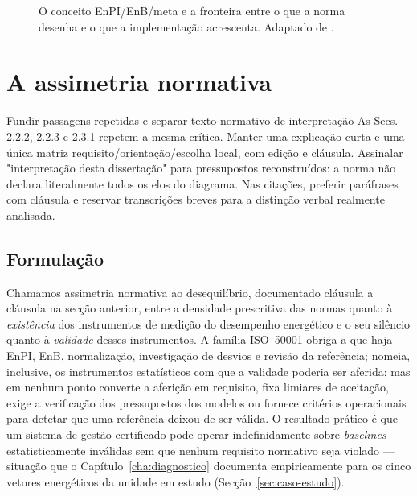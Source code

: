 \begin{figure}[htbp]
  \centering
  \caption[O conceito EnPI/EnB/meta e a extensão de implementação]{O conceito EnPI/EnB/meta e a fronteira entre o que a norma desenha e o que a implementação acrescenta. Adaptado de \cite[Figura~1]{ISO50006_2014}.}
  \label{fig:enpi-enb-meta}
\end{figure}

\section{A assimetria normativa}
\label{sec:assimetria}
{Fundir passagens repetidas e separar texto normativo de interpretação}
{As Secs. 2.2.2, 2.2.3 e 2.3.1 repetem a mesma crítica. Manter uma
explicação curta e uma única matriz requisito/orientação/escolha local,
com edição e cláusula. Assinalar "interpretação desta dissertação" para
pressupostos reconstruídos: a norma não declara literalmente todos os
elos do diagrama. Nas citações, preferir paráfrases com cláusula e
reservar transcrições breves para a distinção verbal realmente analisada.}%

\subsection{Formulação}
\label{sec:assimetria-formulacao}

Chamamos assimetria normativa ao desequilíbrio, documentado cláusula a cláusula na secção anterior, entre a densidade prescritiva das normas quanto à \emph{existência} dos instrumentos de medição do desempenho energético e o seu silêncio quanto à \emph{validade} desses instrumentos. A família ISO~50001 obriga a que haja EnPI, EnB, normalização, investigação de desvios e revisão da referência; nomeia, inclusive, os instrumentos estatísticos com que a validade poderia ser aferida; mas em nenhum ponto converte a aferição em requisito, fixa limiares de aceitação, exige a verificação dos pressupostos dos modelos ou fornece critérios operacionais para detetar que uma referência deixou de ser válida. O resultado prático é que um sistema de gestão certificado pode operar indefinidamente sobre \emph{baselines} estatisticamente inválidas sem que nenhum requisito normativo seja violado --- situação que o Capítulo~\ref{cha:diagnostico} documenta empiricamente para os cinco vetores energéticos da unidade em estudo (Secção~\ref{sec:caso-estudo}).

